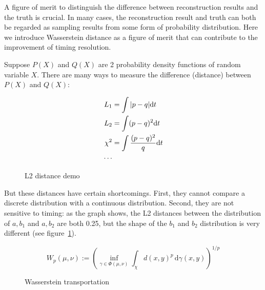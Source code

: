 A figure of merit to distinguish the difference between reconstruction results and the truth is crucial. In many cases, the reconstruction result and truth can both be regarded as sampling results from some form of probability distribution. Here we introduce Wasserstein distance as a figure of merit that can contribute to the improvement of timing resolution. 

Suppose $P(X)$ and $Q(X)$ are 2 probability density functions of random variable $X$. There are many ways to measure the difference (distance) between $P(X)$ and $Q(X)$: 

\begin{minipage}{.3\textwidth}
\begin{align*}
    L_{1} &= \int|p-q| \mathrm{d} t \\
    L_{2} &= \int(p-q)^{2} \mathrm{d} t \\
    \chi^{2} &= \int\frac{(p-q)^{2}}{q} \mathrm{d} t \\
    \cdots
\end{align*}
\end{minipage}
\begin{minipage}{.7\textwidth}
\begin{figure}[H]
    \centering
    \scalebox{0.4}{}
    \caption{\label{fig:l2} L2 distance demo}
\end{figure}
\end{minipage}

But these distances have certain shortcomings. First, they cannot compare a discrete distribution with a continuous distribution. Second, they are not sensitive to timing: as the graph shows, the L2 distances between the distribution of $a,b_{1}$ and $a,b_{2}$ are both 0.25, but the shape of the $b_{1}$ and $b_{2}$ distribution is very different (see figure~\ref{fig:l2}). 

\label{sub:Wasserstein distance}
\begin{minipage}{.45\textwidth}
\begin{equation}
    W_{p}(\mu,\nu):=\left(\inf_{\gamma\in\Phi(\mu,\nu)}\int_{\chi}d(x,y)^{p}\,\mathrm{d}\gamma(x,y)\right)^{1/p} \label{eq:w-dist-def}
\end{equation}
\end{minipage}
\begin{minipage}{.55\textwidth}
\begin{figure}[H]
    \centering
    \scalebox{0.4}{}
    \caption{\label{fig:Wasserstein transportation} Wasserstein transportation}
\end{figure}
\end{minipage}

